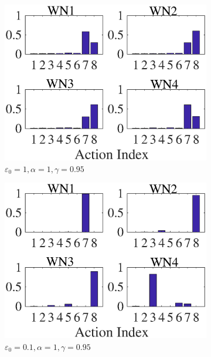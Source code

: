 \documentclass[conference]{IEEEtran}
\begin{document}
	\begin{figure}[]
		\centering
		\begin{subfigure}[b]{0.225\textwidth}
			\includegraphics[width=\textwidth]{images/e_1_a1_g095}
			\caption{$\varepsilon_0=1, \alpha=1, \gamma=0.95$}
			\label{fig:e_1_a1_g095}
		\end{subfigure}
		\begin{subfigure}[b]{0.225\textwidth}
			\includegraphics[width=\textwidth]{images/e_01_a_1_g_095}
			\caption{$\varepsilon_0=0.1, \alpha=1, \gamma=0.95$}
			\label{fig:e_1_a_1_g_095}
		\end{subfigure}
		\begin{subfigure}[b]{0.225\textwidth}

\end{subfigure}
\end{figure}
\end{document}
